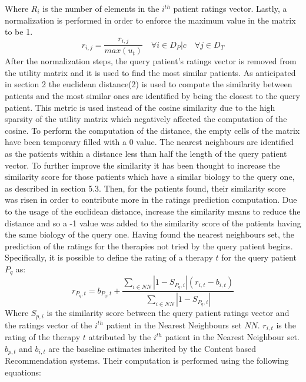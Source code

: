 Where $R_{i}$ is the number of elements in the $i^{th}$ patient ratings
vector.
Lastly, a normalization is performed in order to enforce the maximum value
in the matrix to be 1.
\begin{equation}
		r_{i,j} = \frac{r_{i,j}}{max(u_t)}
		\quad \forall i \in D_{P}|c
		\quad \forall j \in D_T
\end{equation}
After the normalization steps, the query patient's ratings vector is removed
from the utility matrix and it is used to find the most similar patients.
As anticipated in section 2 the euclidean distance(2) is used to compute the
similarity between patients and the most similar ones are identified by being
the closest to the query patient.
This metric is used instead of the cosine similarity due to
the high sparsity of the utility matrix which negatively affected the
computation of the cosine.
To perform the computation of the distance, the empty cells of the matrix
have been temporary filled with a 0 value.
The nearest neighbours are identified as the patients within a distance less than
half the length of the query patient vector.
To further improve the similarity it has been thought to increase the 
similarity score for those patients which have a similar biology to
the query one, as described in section 5.3.
Then, for the patients found,  their similarity
score was risen in order to contribute more in the ratings prediction
computation. Due to the usage of the euclidean distance, increase the
similarity means to reduce the distance and so a -1 value was added to the
similarity score of the patients having the same biology of the query one.
Having found the nearest neighbours set, the
prediction of the ratings for the therapies not tried by the query patient
begins. Specifically, it is possible to define the rating of
a therapy $t$ for the query patient $P_q$ as:
\begin{equation}
		r_{P_q, t} = b_{P_q,t} + \frac{\sum_{i \in NN}|1-S_{P_q,i}|(r_{i,t}-b_{i,t})}
								  {\sum_{i \in NN}|1-S_{P_q,i}|}
\end{equation}
Where $S_{p,i}$ is the similarity score between the query patient ratings
vector and the ratings vector of the $i^{th}$ patient in the Nearest Neighbours
set $NN$. $r_{i, t}$ is the rating of the therapy $t$ attributed by the
$i^{th}$ patient in the Nearest Neighbour set. $b_{p,t}$ and $b_{i, t}$ are the
baseline estimates inherited by the Content based Recommendation systems.
Their computation is performed using the following equations:
